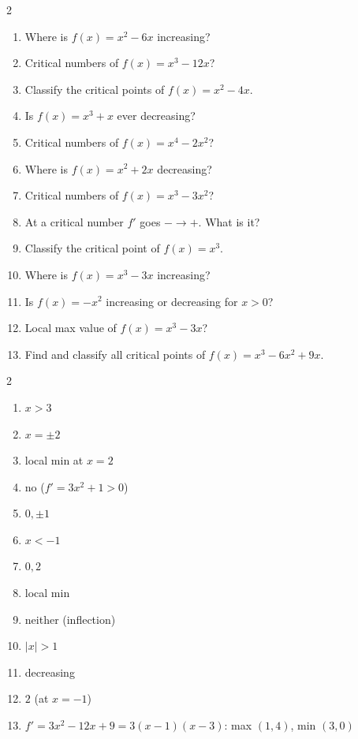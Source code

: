 \documentclass[11pt]{article}
\begin{document}
\begin{recapbox}
\begin{multicols}{2}
\small
\begin{enumerate}[leftmargin=*,itemsep=3pt]
  \item Where is $f(x)=x^2-6x$ increasing?
  \item Critical numbers of $f(x)=x^3-12x$?
  \item Classify the critical points of $f(x)=x^2-4x$.
  \item Is $f(x)=x^3+x$ ever decreasing?
  \item Critical numbers of $f(x)=x^4-2x^2$?
  \item Where is $f(x)=x^2+2x$ decreasing?
  \item Critical numbers of $f(x)=x^3-3x^2$?
  \item At a critical number $f'$ goes $-\to+$. What is it?
  \item Classify the critical point of $f(x)=x^3$.
  \item Where is $f(x)=x^3-3x$ increasing?
  \item Is $f(x)=-x^2$ increasing or decreasing for $x>0$?
  \item Local max value of $f(x)=x^3-3x$?
  \item Find and classify all critical points of $f(x)=x^3-6x^2+9x$.
\end{enumerate}
\end{multicols}
\end{recapbox}

\begin{keybox}
\begin{multicols}{2}
\small
\begin{enumerate}[leftmargin=*,itemsep=3pt]
  \item $x>3$
  \item $x=\pm2$
  \item local min at $x=2$
  \item no ($f'=3x^2+1>0$)
  \item $0,\pm1$
  \item $x<-1$
  \item $0,2$
  \item local min
  \item neither (inflection)
  \item $|x|>1$
  \item decreasing
  \item $2$ (at $x=-1$)
  \item $f'=3x^2-12x+9=3(x-1)(x-3)$: max $(1,4)$, min $(3,0)$
\end{enumerate}
\end{multicols}
\end{keybox}
\end{document}
